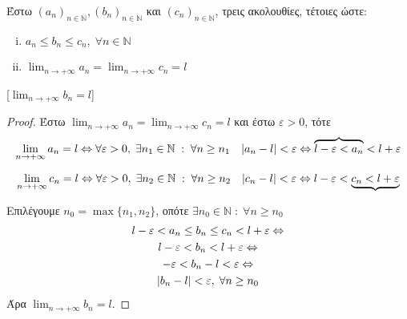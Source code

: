 \begin{mybox3}
  \begin{prop}
    Έστω $ (a_{n})_{n \in \mathbb{N}}, (b_{n})_{n \in \mathbb{N}} $ και 
    $ (c_{n})_{n \in \mathbb{N}} $, τρεις ακολουθίες, τέτοιες ώστε:
  \end{prop}

  \vspace{\baselineskip}

  \begin{minipage}{0.35\textwidth}
    \begin{enumerate}[i)]
      \item $ a_{n} \leq b_{n} \leq c_{n}, \; \forall n \in 
        \mathbb{N} $ \hfill {} 
      \item $ \lim_{n \to +\infty} a_{n} = \lim_{n \to +\infty} 
        c_{n} = l $ \hfill {}
    \end{enumerate}
  \end{minipage}
  [$ \lim_{n \to +\infty} b_{n} = l$]
\end{mybox3}
\begin{proof}
\item {}
  Έστω $ \lim_{n \to +\infty} a_{n} = \lim_{n \to +\infty} c_{n} = l $ και 
  έστω $ \varepsilon >0 $, τότε
  \[ \lim_{n \to +\infty} a_{n} = l \Leftrightarrow \forall 
    \varepsilon >0, \; \exists n_{1} \in \mathbb{N} \; : \; \forall n 
    \geq n_{1} \quad \abs{a_{n} - l} < \varepsilon \Leftrightarrow 
  \overbrace{l - \varepsilon < a_{n}} < l + \varepsilon \] 

  \[ \lim_{n \to +\infty} c_{n} = l \Leftrightarrow \forall 
    \varepsilon >0, \; \exists n_{2} 
    \in \mathbb{N} \; : \; \forall n \geq n_{2} \quad \abs{c_{n} - l} 
    < \varepsilon \Leftrightarrow 
  l - \varepsilon < \underbrace{c_{n} < l + \varepsilon} \]

  Επιλέγουμε $ n_{0} = \max \{ n_{1}, n_{2} \} $, οπότε 
  $ \exists n_{0} \in \mathbb{N} \; : \; 
  \forall n \geq n_{0} $
  \begin{gather*}
    l - \varepsilon < a_{n} \leq b_{n} \leq c_{n} < l + 
    \varepsilon \Leftrightarrow \\
    l - \varepsilon < b_{n} < l + \varepsilon \Leftrightarrow \\
    - \varepsilon < b_{n} - l < \varepsilon \Leftrightarrow \\
    \abs{b_{n}-l} < \varepsilon, \; \forall n \geq n_{0}
  \end{gather*}
  Άρα $ \lim_{n \to +\infty} b_{n} = l $.
\end{proof}

